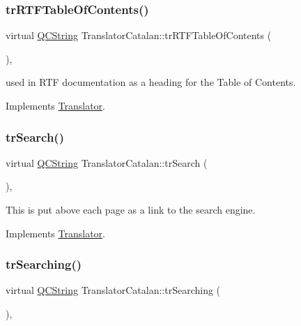 \mbox{\label{class_translator_catalan_a7a00cf1c50c96aaa15eea44755782e35}} 
\subsubsection{\texorpdfstring{trRTFTableOfContents()}{trRTFTableOfContents()}}
{\footnotesize\ttfamily virtual \mbox{\hyperlink{class_q_c_string}{Q\+C\+String}} Translator\+Catalan\+::tr\+R\+T\+F\+Table\+Of\+Contents (\begin{DoxyParamCaption}{ }\end{DoxyParamCaption})\hspace{0.3cm}{\ttfamily [inline]}, {\ttfamily [virtual]}}

used in R\+TF documentation as a heading for the Table of Contents. 

Implements \mbox{\hyperlink{class_translator}{Translator}}.

\mbox{\label{class_translator_catalan_ac3674ebfc779f91b12f6bc6f1e0af169}} 
\subsubsection{\texorpdfstring{trSearch()}{trSearch()}}
{\footnotesize\ttfamily virtual \mbox{\hyperlink{class_q_c_string}{Q\+C\+String}} Translator\+Catalan\+::tr\+Search (\begin{DoxyParamCaption}{ }\end{DoxyParamCaption})\hspace{0.3cm}{\ttfamily [inline]}, {\ttfamily [virtual]}}

This is put above each page as a link to the search engine. 

Implements \mbox{\hyperlink{class_translator}{Translator}}.

\mbox{\label{class_translator_catalan_af9bdc6ff9219376084ef32175daf99ae}} 
\subsubsection{\texorpdfstring{trSearching()}{trSearching()}}
{\footnotesize\ttfamily virtual \mbox{\hyperlink{class_q_c_string}{Q\+C\+String}} Translator\+Catalan\+::tr\+Searching (\begin{DoxyParamCaption}{ }\end{DoxyParamCaption})\hspace{0.3cm}{\ttfamily [inline]}, {\ttfamily [virtual]}}

